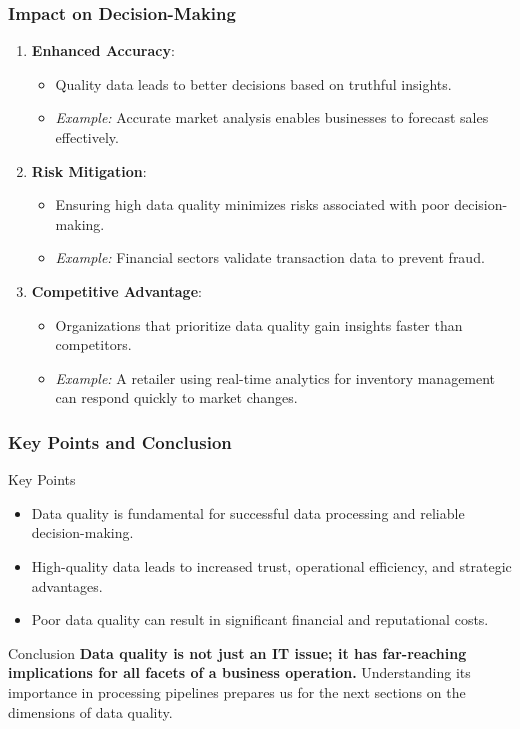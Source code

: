 \documentclass{beamer}
\begin{document}
\begin{frame}[fragile]
    \frametitle{Impact on Decision-Making}
    
    \begin{enumerate}
        \item \textbf{Enhanced Accuracy}:
            \begin{itemize}
                \item Quality data leads to better decisions based on truthful insights.
                \item \textit{Example:} Accurate market analysis enables businesses to forecast sales effectively.
            \end{itemize}

        \item \textbf{Risk Mitigation}:
            \begin{itemize}
                \item Ensuring high data quality minimizes risks associated with poor decision-making.
                \item \textit{Example:} Financial sectors validate transaction data to prevent fraud.
            \end{itemize}
        
        \item \textbf{Competitive Advantage}:
            \begin{itemize}
                \item Organizations that prioritize data quality gain insights faster than competitors.
                \item \textit{Example:} A retailer using real-time analytics for inventory management can respond quickly to market changes.
            \end{itemize}
    \end{enumerate}
\end{frame}

\begin{frame}[fragile]
    \frametitle{Key Points and Conclusion}
    
    \begin{block}{Key Points}
        \begin{itemize}
            \item Data quality is fundamental for successful data processing and reliable decision-making.
            \item High-quality data leads to increased trust, operational efficiency, and strategic advantages.
            \item Poor data quality can result in significant financial and reputational costs.
        \end{itemize}
    \end{block}
    
    \begin{block}{Conclusion}
        \textbf{Data quality is not just an IT issue; it has far-reaching implications for all facets of a business operation.}
        Understanding its importance in processing pipelines prepares us for the next sections on the dimensions of data quality.
    \end{block}
\end{frame}
\end{document}
